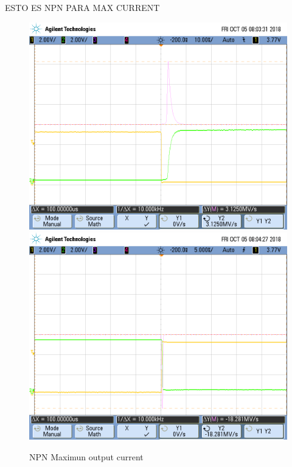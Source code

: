 ESTO ES NPN PARA MAX CURRENT
\begin{figure}[h!]
\centering
\includegraphics[scale=0.3]{../Exercise1/i_npn2.png}\hspace{1cm}
\includegraphics[scale=0.3]{../Exercise1/i_npn3.png}
\caption{NPN Maximun output current}
\label{circnpnmaxout}
\end{figure}

